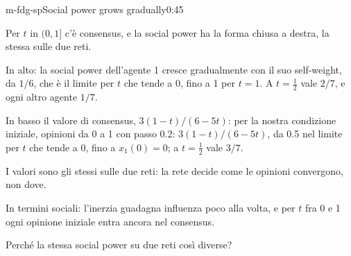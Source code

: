 \begin{slide}{m-fdg-sp}{Social power grows gradually}{0:45}
  \begin{discorso}
    \item Per $t$ in $(0,1]$ c'è consensus, e la social power ha la forma chiusa a destra, la stessa sulle due reti.
    \item In alto: la social power dell'agente 1 cresce gradualmente con il suo self-weight, da $1/6$, che è il limite per $t$ che tende a 0, fino a 1 per $t=1$. A $t=\tfrac12$ vale $2/7$, e ogni altro agente $1/7$.
    \item In basso il valore di consensus, {\color{red}$3(1-t)/(6-5t)$:} {\color{blue}per la nostra condizione iniziale, opinioni da 0 a 1 con passo 0.2: $3(1-t)/(6-5t)$,} da 0.5 nel limite per $t$ che tende a 0, fino a $x_1(0)=0$; a $t=\tfrac12$ vale $3/7$.
    \item I valori sono gli stessi sulle due reti: la rete decide come le opinioni convergono, non dove.
    \item In termini sociali: l'inerzia guadagna influenza poco alla volta, e per $t$ fra 0 e 1 ogni opinione iniziale entra ancora nel consensus.
    \item Perché la stessa social power su due reti così diverse?
  \end{discorso}
\end{slide}

